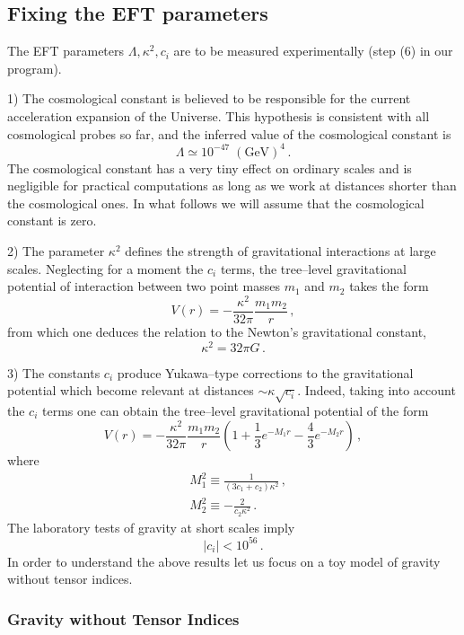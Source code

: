 \documentclass[11pt,a4paper]{article}
\newcommand{\be}{\begin{equation}}
\newcommand{\ee}{\end{equation}}
\begin{document}
\subsection{Fixing the EFT parameters}

The EFT parameters $\Lambda, \kappa^2, c_i$ are to be measured experimentally (step (6) in our program).

1) The cosmological constant is believed to be responsible for the current acceleration expansion
of the Universe. This hypothesis is consistent with all cosmological probes so far,
and the inferred value of the cosmological constant is
\be
\Lambda\simeq 10^{-47}\;(\text{GeV})^4 \,.
\ee
The cosmological constant has a very tiny effect on ordinary scales and is negligible for
practical computations as long as we work at distances shorter than the cosmological ones.
In what follows we will assume that the cosmological constant is zero.


2) The parameter $\kappa^2$ defines the strength of gravitational interactions at large scales.
Neglecting for a moment the $c_i$ terms, the tree--level gravitational potential of interaction between two point masses $m_1$ and $m_2$
takes the form
\be
V(r)=-\frac{\kappa^2}{32\pi} \frac{m_1m_2}{r}\,,
\ee
from which one deduces the relation to the Newton's gravitational constant,
\be
 \kappa^2=32 \pi G\,.
\ee

3) The constants $c_i$ produce Yukawa--type corrections to the gravitational potential which become
relevant at distances $\sim \kappa \sqrt{c_i}$. Indeed, taking into account the $c_i$ terms
one can obtain the tree--level gravitational potential of the form \cite{Stelle:1977ry}
\be
V(r)=-\frac{\kappa^2}{32\pi} \frac{m_1m_2}{r}\left(1+\frac{1}{3}e^{-M_1r}-\frac{4}{3}e^{-M_2r}\right)\,,
\ee
where
\be
\label{eq:masses}
\begin{split}
& M_1^2\equiv \frac{1}{(3c_1+c_2)\kappa^2}\,,\\
& M_2^2\equiv -\frac{2}{c_2\kappa^2}\,.
\end{split}
\ee
The laboratory tests of gravity at short scales imply
\be
|c_i|<10^{56}\,.
\ee
In order to understand the above results let us focus
on a toy model of gravity without tensor indices.

\subsubsection{Gravity without Tensor Indices}
\end{document}
